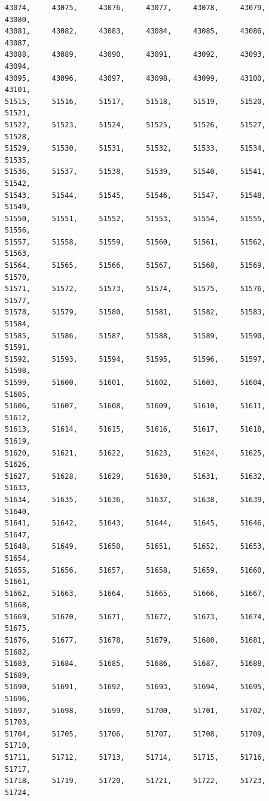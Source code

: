 \documentclass[a4paper,11pt]{report}
\begin{document}
\begin{verbatim}
43074,     43075,     43076,     43077,     43078,     43079,     43080,     
43081,     43082,     43083,     43084,     43085,     43086,     43087,     
43088,     43089,     43090,     43091,     43092,     43093,     43094,     
43095,     43096,     43097,     43098,     43099,     43100,     43101,     
51515,     51516,     51517,     51518,     51519,     51520,     51521,     
51522,     51523,     51524,     51525,     51526,     51527,     51528,     
51529,     51530,     51531,     51532,     51533,     51534,     51535,     
51536,     51537,     51538,     51539,     51540,     51541,     51542,     
51543,     51544,     51545,     51546,     51547,     51548,     51549,     
51550,     51551,     51552,     51553,     51554,     51555,     51556,     
51557,     51558,     51559,     51560,     51561,     51562,     51563,     
51564,     51565,     51566,     51567,     51568,     51569,     51570,     
51571,     51572,     51573,     51574,     51575,     51576,     51577,     
51578,     51579,     51580,     51581,     51582,     51583,     51584,     
51585,     51586,     51587,     51588,     51589,     51590,     51591,     
51592,     51593,     51594,     51595,     51596,     51597,     51598,     
51599,     51600,     51601,     51602,     51603,     51604,     51605,     
51606,     51607,     51608,     51609,     51610,     51611,     51612,     
51613,     51614,     51615,     51616,     51617,     51618,     51619,     
51620,     51621,     51622,     51623,     51624,     51625,     51626,     
51627,     51628,     51629,     51630,     51631,     51632,     51633,     
51634,     51635,     51636,     51637,     51638,     51639,     51640,     
51641,     51642,     51643,     51644,     51645,     51646,     51647,     
51648,     51649,     51650,     51651,     51652,     51653,     51654,     
51655,     51656,     51657,     51658,     51659,     51660,     51661,     
51662,     51663,     51664,     51665,     51666,     51667,     51668,     
51669,     51670,     51671,     51672,     51673,     51674,     51675,     
51676,     51677,     51678,     51679,     51680,     51681,     51682,     
51683,     51684,     51685,     51686,     51687,     51688,     51689,     
51690,     51691,     51692,     51693,     51694,     51695,     51696,     
51697,     51698,     51699,     51700,     51701,     51702,     51703,     
51704,     51705,     51706,     51707,     51708,     51709,     51710,     
51711,     51712,     51713,     51714,     51715,     51716,     51717,     
51718,     51719,     51720,     51721,     51722,     51723,     51724,     

\end{verbatim}
\end{document}

